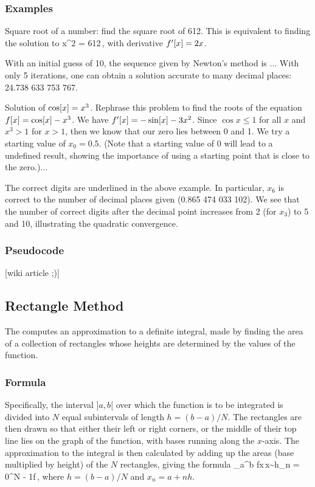 \subsubsection{Examples}
Square root of a number: find the square root of 612. This is equivalent to finding the solution to
\beq
x^2 = 612\,,
\eeq
with derivative $f'\!\left[{x}\right] = 2x$.

With an initial guess of 10, the sequence given by Newton's method is ... With only 5 iterations, one can obtain a solution accurate to many decimal places: 24.738 633 753 767.

Solution of $\cos\!\left[{x}\right] = x^3$. Rephrase this problem to find the roots of the equation $f\!\left[{x}\right] = \cos\!\left[{x}\right] - x^3$. We have $f'\!\left[{x}\right] = -\sin\!\left[{x}\right] - 3x^2$. Since $\cos x\leq 1$ for all $x$ and $x^3 > 1$ for $x > 1$, then we know that our zero lies between 0 and 1. We try a starting value of $x_0 = 0.5$. (Note that a starting value of 0 will lead to a undefined result, showing the importance of using a starting point that is close to the zero.)...

The correct digits are underlined in the above example. In particular, $x_6$ is correct to the number of decimal places given (0.865 474 033 102). We see that the number of correct digits after the decimal point increases from 2 (for $x_3$) to 5 and 10, illustrating the quadratic convergence.


\subsubsection{Pseudocode}
[wiki article ;)]


\subsection{Rectangle Method}
The  computes an approximation to a definite integral, made by finding the area of a collection of rectangles whose heights are determined by the values of the function.


\subsubsection{Formula}
Specifically, the interval $]a,b[$ over which the function is to be integrated is divided into $N$ equal subintervals of length $h = (b-a)/N$. The rectangles are then drawn so that either their left or right corners, or the middle of their top line lies on the graph of the function, with bases running along the $x$-axis. The approximation to the integral is then calculated by adding up the areas (base multiplied by height) of the $N$ rectangles, giving the formula
\beq
\int_a^b f\vat x\,\dx x\sim h\sum_{n = 0}^{N - 1}f\,,
\eeq
where $h = (b-a)/N$ and $x_n = a + nh$.

